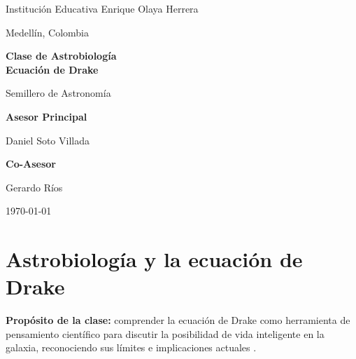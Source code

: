 \documentclass[12pt,oneside]{book}
\newcommand{\Institucion}{Institución Educativa Enrique Olaya Herrera}
\newcommand{\Ciudad}{Medellín, Colombia}
\newcommand{\AsesorPrincipal}{Daniel Soto Villada}
\newcommand{\CoAsesor}{Gerardo Ríos}
\newcommand{\TituloDocumento}{Clase de Astrobiología\\[0.4em]Ecuación de Drake}
\begin{document}
\hypersetup{pageanchor=false}

\begin{titlepage}
    \centering
    \vspace*{1.5cm}
    {\Large\textcolor{grisSec}{\Institucion}\par}
    \vspace{0.2cm}
    {\large\textcolor{grisSec}{\Ciudad}\par}

    \vspace{2.0cm}
    {\Huge\bfseries\textcolor{azulCosmos}{\TituloDocumento}\par}
    \vspace{0.5cm}
    {\Large\textcolor{grisSec}{Semillero de Astronomía}\par}

    \vspace{2.2cm}
    \begin{tcolorbox}[colback=grisClaro,colframe=azulCosmos,boxrule=0.9pt,arc=2mm,width=0.82\textwidth]
        \centering
        {\large\bfseries\textcolor{azulCosmos}{Asesor Principal}\par}
        \vspace{0.2cm}
        {\large \AsesorPrincipal\par}
        \vspace{0.4cm}
        {\large\bfseries\textcolor{azulCosmos}{Co-Asesor}\par}
        \vspace{0.2cm}
        {\large \CoAsesor\par}
    \end{tcolorbox}

    \vfill
    {\large\textcolor{grisSec}{\today}\par}
\end{titlepage}

\frontmatter
\tableofcontents
\clearpage

\mainmatter
\hypersetup{pageanchor=true}

\chapter{Astrobiología y la ecuación de Drake}

\begin{destacado}
    \textbf{Propósito de la clase:} comprender la ecuación de Drake como herramienta de pensamiento científico para discutir la posibilidad de vida inteligente en la galaxia, reconociendo sus límites e implicaciones actuales \cite{baak2026implicationspessimisticlowerlimit,stern2024tectonics}.
\end{destacado}
\end{document}
